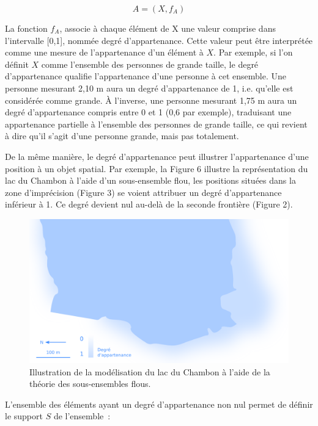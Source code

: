 \begin{equation}
  A = (X, f_A)  
\end{equation}

La fonction $f_A$, associe à chaque élément de X une valeur comprise
dans l’intervalle [0,1], nommée degré d’appartenance. Cette valeur
peut être interprétée comme une mesure de l’appartenance d’un élément
à $X$. Par exemple, si l’on définit $X$ comme l’ensemble des personnes
de grande taille, le degré d’appartenance qualifie l’appartenance
d’une personne à cet ensemble. Une personne mesurant 2,10 m aura un
degré d’appartenance de 1, i.e. qu’elle est considérée comme grande. À
l’inverse, une personne mesurant 1,75 m aura un degré d’appartenance
compris entre 0 et 1 (0,6 par exemple), traduisant une appartenance
partielle à l’ensemble des personnes de grande taille, ce qui revient
à dire qu’il s’agit d’une personne grande, mais pas totalement.

De la même manière, le degré d’appartenance peut illustrer
l’appartenance d’une position à un objet spatial. Par exemple, la
Figure 6 illustre la représentation du lac du Chambon à l’aide d’un
sous-ensemble flou, les positions situées dans la zone d’imprécision
(Figure 3) se voient attribuer un degré d’appartenance inférieur à
1. Ce degré devient nul au-delà de la seconde frontière (Figure 2).

\begin{figure}
  \centering
  \includegraphics{../figures/fig6.png}
  \caption{Illustration de la modélisation du lac du Chambon à l’aide
    de la théorie des sous-ensembles flous.}
  \label{fig:champ_flou}
\end{figure}

L’ensemble des éléments ayant un degré d’appartenance non nul permet
de définir le support $S$ de l’ensemble :

